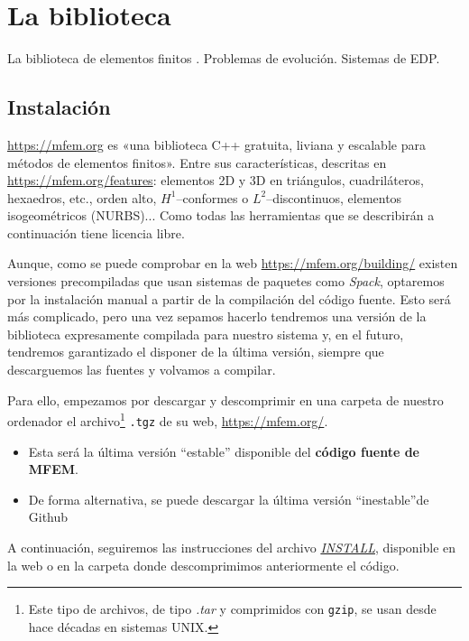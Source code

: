 \section{La biblioteca \mfem}

\begin{contenidos}
La biblioteca de elementos finitos \mfem. Problemas de evolución. Sistemas de EDP.
\end{contenidos}

\subsection{Instalación}
\label{sec:03:instalacion}

\mfem \url{https://mfem.org} es «una biblioteca C++ gratuita, liviana
y escalable para métodos de elementos finitos».  Entre sus
características, descritas en \url{https://mfem.org/features}:
elementos 2D y 3D en triángulos, cuadriláteros, hexaedros, etc., orden
alto, $H^1$--conformes o $L^2$--discontinuos, elementos isogeométricos
(NURBS)...  Como todas las herramientas que se describirán a
continuación \mfem tiene licencia libre.

Aunque, como se puede comprobar en la web
\url{https://mfem.org/building/} existen versiones precompiladas que
usan sistemas de paquetes como \textit{Spack}, optaremos por la
instalación manual a partir de la compilación del código fuente.
Esto será más complicado, pero una vez sepamos hacerlo tendremos una
versión de la biblioteca expresamente compilada para nuestro sistema
y, en el futuro, tendremos garantizado el disponer de la última
versión, siempre que descarguemos las fuentes y volvamos a compilar.

Para ello, empezamos por descargar y descomprimir en una carpeta de
nuestro ordenador el archivo\footnote{Este tipo de archivos, de tipo
  \textit{.tar} y comprimidos con \texttt{gzip}, se usan desde hace
  décadas en sistemas UNIX.}  \texttt{.tgz} de su web,
\url{https://mfem.org/}.
\begin{itemize}
\item Esta será la última versión ``estable'' disponible del \textbf{código fuente de MFEM}.
\item De forma alternativa, se puede descargar la última versión ``inestable''de Github
\end{itemize}


A continuación, seguiremos las instrucciones del archivo
\href{https://raw.githubusercontent.com/mfem/mfem/master/INSTALL}{\textit{INSTALL}},
disponible en la web o en la carpeta donde descomprimimos anteriormente el código.

